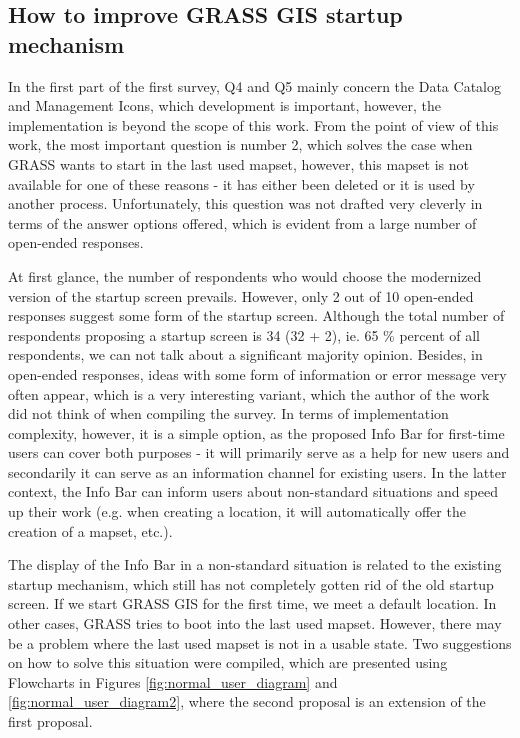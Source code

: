 \documentclass[a4paper,10pt,twoside]{article}
\begin{document}
\subsection{How to improve GRASS GIS startup mechanism}
\label{sec:proposal2}

In the first part of the first survey, Q4 and Q5 mainly concern the Data Catalog and Management Icons, which development  is important, however, the implementation is beyond the scope of this work. From the point of view of this work, the most important question is number 2, which solves the case when GRASS wants to start in the last used mapset, however, this mapset is not available for one of these reasons - it has either been deleted or it is used by another process. Unfortunately, this question was not drafted very cleverly in terms of the answer options offered, which is evident from a large number of open-ended responses.

At first glance, the number of respondents who would choose the modernized version of the startup screen prevails. However, only 2 out of 10 open-ended responses suggest some form of the startup screen. Although the total number of respondents proposing a startup screen is 34 (32 + 2), ie. 65 \% percent of all respondents, we can not talk about a significant majority opinion. Besides, in open-ended responses, ideas with some form of information or error message very often appear, which is a very interesting variant, which the author of the work did not think of when compiling the survey. In terms of implementation complexity, however, it is a simple option, as the proposed Info Bar for first-time users can cover both purposes - it will primarily serve as a help for new users and secondarily it can serve as an information channel for existing users. In the latter context, the Info Bar can inform users about non-standard situations and speed up their work (e.g. when creating a location, it will automatically offer the creation of a mapset, etc.).

The display of the Info Bar in a non-standard situation is related to the existing startup mechanism, which still has not completely gotten rid of the old startup screen. If we start GRASS GIS for the first time, we meet a default location. In other cases, GRASS tries to boot into the last used mapset. However, there may be a problem where the last used mapset is not in a usable state. Two suggestions on how to solve this situation were compiled, which are presented using Flowcharts in Figures \ref{fig:normal_user_diagram} and \ref{fig:normal_user_diagram2}, where the second proposal is an extension of the first proposal.
\end{document}
